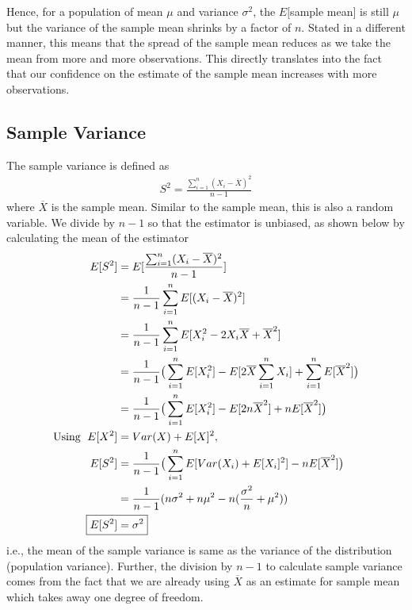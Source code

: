 \documentclass[../probability-notes.tex]{subfiles}
\begin{document}
    Hence, for a population of mean $\mu$ and variance $\sigma^{2}$, the $E[$sample mean$]$ is still $\mu$ but the variance of the sample mean shrinks by a factor of $n$. Stated in a different manner, this means that the spread of the sample mean reduces as we take the mean from more and more observations. This directly translates into the fact that our confidence on the estimate of the sample mean increases with more observations.\newline

    \subsection{Sample Variance}
    The sample variance is defined as
    \begin{align*}
        S^{2} = \frac{\sum_{i=1}^{n} (X_{i} - \overline{X})^{2}}{n - 1}
    \end{align*}
    where $\overline{X}$ is the sample mean. Similar to the sample mean, this is also a random variable. We divide by $n-1$ so that the estimator is unbiased, as shown below by calculating the mean of the estimator
    \begin{align*}
        E[S^{2}] &= E[\frac{\sum_{i=1}^{n} (X_{i} - \overline{X})^{2}}{n - 1}]\\
        &= \frac{1}{n-1} \sum_{i=1}^{n} E[(X_{i} - \overline{X})^{2}]\\
        &= \frac{1}{n-1} \sum_{i=1}^{n} E[X_{i}^{2} - 2X_{i} \overline{X} + \overline{X}^{2}]\\
        &= \frac{1}{n-1} \big( \sum_{i=1}^{n} E[X_{i}^{2}] - E[2\overline{X} \sum_{i=1}^{n}X_{i}] + \sum_{i=1}^{n}E[\overline{X}^{2}] \big)\\
        &= \frac{1}{n-1} \big( \sum_{i=1}^{n} E[X_{i}^{2}] - E[2n\overline{X}^{2}] + nE[\overline{X}^{2}] \big)\\
        \text{Using \;} E[X^{2}] &= Var(X) + E[X]^{2},\\
        E[S^{2}] &= \frac{1}{n-1} \big( \sum_{i=1}^{n} E[Var(X_{i}) + E[X_{i}]^{2}] - nE[\overline{X}^{2}] \big)\\
        &= \frac{1}{n-1}(n\sigma^{2} + n\mu^{2} - n(\frac{\sigma^{2}}{n} + \mu^{2}))\\
        \Aboxed{E[S^{2}] &= \sigma^{2}}
    \end{align*}
    i.e., the mean of the sample variance is same as the variance of the distribution (population variance). Further, the division by $n-1$ to calculate sample variance comes from the fact that we are already using $\overline{X}$ as an estimate for sample mean which takes away one degree of freedom.
\end{document}

